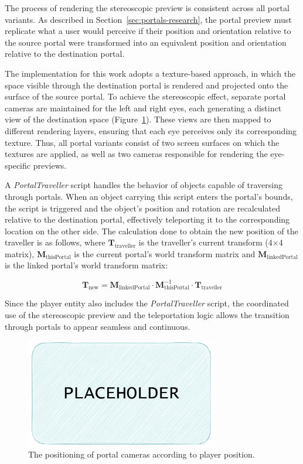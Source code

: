 The process of rendering the stereoscopic preview is consistent across all portal variants. As described in Section~\ref{sec:portals-research}, 
the portal preview must replicate what a user would perceive if their position and orientation relative to the source portal were transformed 
into an equivalent position and orientation relative to the destination portal.

The implementation for this work adopts a texture-based approach, in which the space visible through the destination portal is rendered and projected onto 
the surface of the source portal. To achieve the stereoscopic effect, separate portal cameras are maintained for the left and right eyes, 
each generating a distinct view of the destination space (Figure~\ref{fig:cam-placement}). These views are then mapped to different rendering 
layers, ensuring that each eye perceives only its corresponding texture. Thus, all portal variants consist of two screen surfaces on which the 
textures are applied, as well as two cameras responsible for rendering the eye-specific previews.

A \textit{PortalTraveller} script handles the behavior of objects capable of traversing through portals. 
When an object carrying this script enters the portal's bounds, the script is triggered and the object's
position and rotation are recalculated relative to the destination portal, effectively teleporting it to the corresponding 
location on the other side. The calculation done to obtain the new position of the traveller is as follows, where 
$\mathbf{T}_{\text{traveller}}$ is the traveller's current transform (4×4 matrix), $\mathbf{M}_{\text{thisPortal}}$ is the current portal's world transform matrix 
and $\mathbf{M}_{\text{linkedPortal}}$ is the linked portal's world transform matrix:

\[
\mathbf{T}_{\text{new}} = \mathbf{M}_{\text{linkedPortal}} \cdot 
                           \mathbf{M}_{\text{thisPortal}}^{-1} \cdot 
                           \mathbf{T}_{\text{traveller}}
\]

Since the player entity also includes the \textit{PortalTraveller} script, the coordinated use of the stereoscopic 
preview and the teleportation logic allows the transition through portals to appear seamless and continuous.

\begin{figure}[t]
    \centering
     \includegraphics[width=0.75\textwidth]{NOVAthesisFiles/Images/placeholder.pdf}
     \caption[The positioning of portal cameras according to player position.]
     {The positioning of portal cameras according to player position.}
     \label{fig:cam-placement}
\end{figure}

